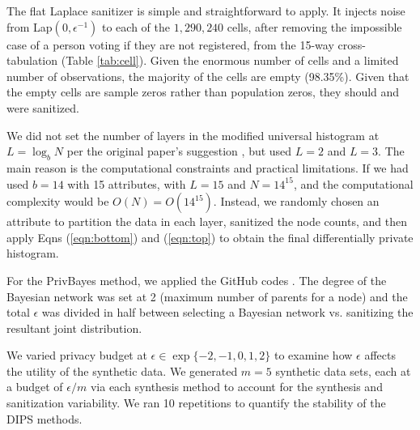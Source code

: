 \documentclass[12pt, A4]{article}
\theoremstyle{plain}
\theoremstyle{exampstyle}\newtheorem{defn}{Definition}
\theoremstyle{exampstyle}\newtheorem{lem}{Lemma}
\theoremstyle{exampstyle}\newtheorem{cor}{Corollary}
\theoremstyle{exampstyle}\newtheorem{pro}{Proposition}
\theoremstyle{exampstyle}\newtheorem{cla}{Claim}
\theoremstyle{exampstyle}\newtheorem{rem}{Remark}
\begin{document}
The flat Laplace sanitizer is simple and straightforward to apply. It injects noise from Lap$(0, \epsilon^{-1})$ to each of the $1,290,240$ cells, after removing the impossible case of a person voting if they are not registered, from the  15-way cross-tabulation (Table \ref{tab:cell}). Given the enormous number of cells and a limited number of observations, the majority of the cells are empty (98.35\%). Given that the empty cells are sample zeros rather than population zeros, they should and were sanitized.

\begin{table}[!htb]\centering
{}
\caption{Summary of cell sizes and frequencies in the full cross tabulation of the youth voter data.}\label{tab:cell}
\end{table}

We did not set the number of layers in the modified universal histogram at $L=\log_bN$ per the original paper's suggestion \cite{hay2010boosting}, but used $L=2$ and $L=3$. The main reason is the computational constraints and practical limitations. If we had used $b=14$ with 15 attributes, with $L=15$ and $N=14^{15}$, and the computational complexity would be  $O(N)=O(14^{15})$. Instead, we randomly chosen an attribute to partition the data in each layer, sanitized the node counts, and then apply Eqns (\ref{eqn:bottom}) and (\ref{eqn:top}) to obtain the final differentially private histogram.

For the PrivBayes method, we applied the GitHub codes \citep{DataSynthesizercodes,DataSynthesizer}. The degree of the Bayesian network was set at 2 (maximum number of parents for a node) and the total $\epsilon$ was divided in half between selecting a Bayesian network vs. sanitizing the resultant joint distribution.

We varied privacy budget at $\epsilon\in \exp\{-2,-1,0,1,2\}$ to examine how $\epsilon$ affects the utility of the synthetic data. We generated $m=5$ synthetic data sets, each at a budget of $\epsilon/m$ via each synthesis method to account for the synthesis and sanitization variability. We ran 10 repetitions to quantify the stability of the DIPS methods.
\end{document}
